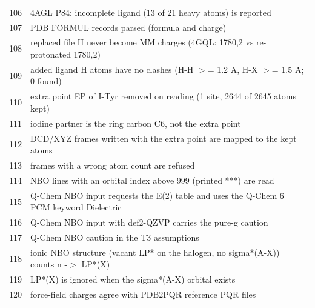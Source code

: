 {\begin{longtable}{rp{14.5cm}}
106 & 4AGL P84: incomplete ligand (13 of 21 heavy atoms) is reported\\
107 & PDB FORMUL records parsed (formula and charge)\\
108 & replaced file H never become MM charges (4GQL: 1780,2 vs re-protonated 1780,2)\\
109 & added ligand H atoms have no clashes (H-H $>$= 1.2 A, H-X $>$= 1.5 A; 0 found)\\
110 & extra point EP of I-Tyr removed on reading (1 site, 2644 of 2645 atoms kept)\\
111 & iodine partner is the ring carbon C6, not the extra point\\
112 & DCD/XYZ frames written with the extra point are mapped to the kept atoms\\
113 & frames with a wrong atom count are refused\\
114 & NBO lines with an orbital index above 999 (printed ***) are read\\
115 & Q-Chem NBO input requests the E(2) table and uses the Q-Chem 6 PCM keyword Dielectric\\
116 & Q-Chem NBO input with def2-QZVP carries the pure-g caution\\
117 & Q-Chem NBO caution in the T3 assumptions\\
118 & ionic NBO structure (vacant LP* on the halogen, no sigma*(A-X)) counts n -$>$ LP*(X)\\
119 & LP*(X) is ignored when the sigma*(A-X) orbital exists\\
120 & force-field charges agree with PDB2PQR reference PQR files\\
\end{longtable}}
